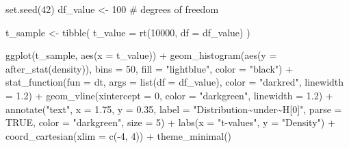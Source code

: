 \documentclass[
  letterpaper,
  DIV=11,
  numbers=noendperiod]{scrreprt}
\newenvironment{Shaded}{\begin{snugshade}}{\end{snugshade}}
\newcommand{\AttributeTok}[1]{\textcolor[rgb]{0.40,0.45,0.13}{#1}}
\newcommand{\CommentTok}[1]{\textcolor[rgb]{0.37,0.37,0.37}{#1}}
\newcommand{\ConstantTok}[1]{\textcolor[rgb]{0.56,0.35,0.01}{#1}}
\newcommand{\DecValTok}[1]{\textcolor[rgb]{0.68,0.00,0.00}{#1}}
\newcommand{\FloatTok}[1]{\textcolor[rgb]{0.68,0.00,0.00}{#1}}
\newcommand{\FunctionTok}[1]{\textcolor[rgb]{0.28,0.35,0.67}{#1}}
\newcommand{\NormalTok}[1]{\textcolor[rgb]{0.00,0.23,0.31}{#1}}
\newcommand{\OtherTok}[1]{\textcolor[rgb]{0.00,0.23,0.31}{#1}}
\newcommand{\SpecialCharTok}[1]{\textcolor[rgb]{0.37,0.37,0.37}{#1}}
\newcommand{\StringTok}[1]{\textcolor[rgb]{0.13,0.47,0.30}{#1}}
\begin{document}
\begin{Shaded}
\begin{Highlighting}[]
\FunctionTok{set.seed}\NormalTok{(}\DecValTok{42}\NormalTok{)}
\NormalTok{df\_value }\OtherTok{\textless{}{-}} \DecValTok{100}  \CommentTok{\# degrees of freedom}

\NormalTok{t\_sample }\OtherTok{\textless{}{-}} \FunctionTok{tibble}\NormalTok{(}
  \AttributeTok{t\_value =} \FunctionTok{rt}\NormalTok{(}\DecValTok{10000}\NormalTok{, }\AttributeTok{df =}\NormalTok{ df\_value)}
\NormalTok{)}

\FunctionTok{ggplot}\NormalTok{(t\_sample, }\FunctionTok{aes}\NormalTok{(}\AttributeTok{x =}\NormalTok{ t\_value)) }\SpecialCharTok{+}
  \FunctionTok{geom\_histogram}\NormalTok{(}\FunctionTok{aes}\NormalTok{(}\AttributeTok{y =} \FunctionTok{after\_stat}\NormalTok{(density)),}
                 \AttributeTok{bins =} \DecValTok{50}\NormalTok{,}
                 \AttributeTok{fill =} \StringTok{"lightblue"}\NormalTok{,}
                 \AttributeTok{color =} \StringTok{"black"}\NormalTok{) }\SpecialCharTok{+}
  \FunctionTok{stat\_function}\NormalTok{(}\AttributeTok{fun =}\NormalTok{ dt,}
                \AttributeTok{args =} \FunctionTok{list}\NormalTok{(}\AttributeTok{df =}\NormalTok{ df\_value),}
                \AttributeTok{color =} \StringTok{"darkred"}\NormalTok{,}
                \AttributeTok{linewidth =} \FloatTok{1.2}\NormalTok{) }\SpecialCharTok{+}
  \FunctionTok{geom\_vline}\NormalTok{(}\AttributeTok{xintercept =} \DecValTok{0}\NormalTok{, }\AttributeTok{color =} \StringTok{"darkgreen"}\NormalTok{, }\AttributeTok{linewidth =} \FloatTok{1.2}\NormalTok{) }\SpecialCharTok{+}
  \FunctionTok{annotate}\NormalTok{(}\StringTok{"text"}\NormalTok{, }\AttributeTok{x =} \FloatTok{1.75}\NormalTok{, }\AttributeTok{y =} \FloatTok{0.35}\NormalTok{,}
           \AttributeTok{label =} \StringTok{"Distribution\textasciitilde{}under\textasciitilde{}H[0]"}\NormalTok{, }\AttributeTok{parse =} \ConstantTok{TRUE}\NormalTok{,}
           \AttributeTok{color =} \StringTok{"darkgreen"}\NormalTok{, }\AttributeTok{size =} \DecValTok{5}\NormalTok{) }\SpecialCharTok{+}
  \FunctionTok{labs}\NormalTok{(}\AttributeTok{x =} \StringTok{"t{-}values"}\NormalTok{, }\AttributeTok{y =} \StringTok{"Density"}\NormalTok{) }\SpecialCharTok{+}
  \FunctionTok{coord\_cartesian}\NormalTok{(}\AttributeTok{xlim =} \FunctionTok{c}\NormalTok{(}\SpecialCharTok{{-}}\DecValTok{4}\NormalTok{, }\DecValTok{4}\NormalTok{)) }\SpecialCharTok{+}
  \FunctionTok{theme\_minimal}\NormalTok{()}
\end{Highlighting}
\end{Shaded}
\end{document}
